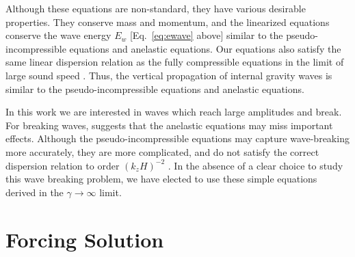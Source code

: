 \documentclass[
        fleqn,
        usenatbib,
    ]{mnras}
\begin{document}
Although these equations are non-standard, they have various desirable
properties. They conserve mass and momentum, and the linearized equations
conserve the wave energy $E_w$ [Eq.~\eqref{eq:ewave} above] similar to the
pseudo-incompressible equations and anelastic equations. Our equations also
satisfy the same linear dispersion relation as the fully compressible equations
in the limit of large sound speed \citep[this is also true for the anelastic
equations, but not pseudo-incompressible,][]{anel_part1, anel_part2}. Thus, the
vertical propagation of internal gravity waves is similar to the
pseudo-incompressible equations and anelastic equations.

In this work we are interested in waves which reach large amplitudes and break.
For breaking waves, \citet{achatz_igw_pi} suggests that the anelastic equations
may miss important effects. Although the pseudo-incompressible equations may
capture wave-breaking more accurately, they are more complicated, and do not
satisfy the correct dispersion relation to order $(k_z H)^{-2}$
\citep{anel_part2}. In the absence of a clear choice to study this wave breaking
problem, we have elected to use these simple equations derived in the
$\gamma\rightarrow\infty$ limit.

\section{Forcing Solution}\label{s:force_solved}
\end{document}

